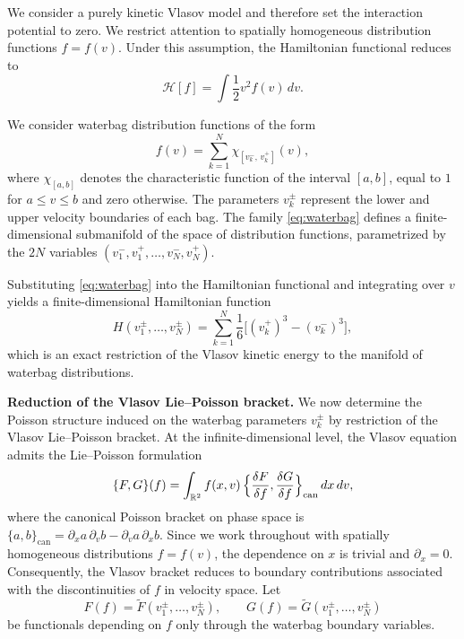 \documentclass{article}
\theoremstyle{remark}
\theoremstyle{definition}
\begin{document}
We consider a purely kinetic Vlasov model and therefore set the interaction
potential to zero. We restrict attention to spatially homogeneous distribution
functions $f=f(v)$. Under this assumption, the Hamiltonian functional reduces to
\begin{equation}\label{hamwaterbag1}
\mathcal{H}[f]
=
\int \frac12 v^2 f(v)\,dv.
\end{equation}

We consider waterbag distribution functions of the form
\begin{equation}\label{eq:waterbag}
f(v)
=
\sum_{k=1}^N
\chi_{[v_k^-,\,v_k^+]}(v),
\end{equation}
where $\chi_{[a,b]}$ denotes the characteristic function of the interval
$[a,b]$, equal to $1$ for $a\le v\le b$ and zero otherwise. The parameters
$v_k^\pm$ represent the lower and upper velocity boundaries of each bag.
The family \eqref{eq:waterbag} defines a finite-dimensional submanifold of the
space of distribution functions, parametrized by the $2N$ variables
$(v_1^-,v_1^+,\dots,v_N^-,v_N^+)$.

Substituting \eqref{eq:waterbag} into the Hamiltonian functional and integrating
over $v$ yields a finite-dimensional Hamiltonian function
\begin{equation}\label{Ham2}
H(v_1^\pm,\dots,v_N^\pm)
=
\sum_{k=1}^N
\frac16\bigl[(v_k^+)^3-(v_k^-)^3\bigr],
\end{equation}
which is an exact restriction of the Vlasov kinetic energy to the manifold of
waterbag distributions.

\medskip
\noindent
\textbf{Reduction of the Vlasov Lie--Poisson bracket.}
We now determine the Poisson structure induced on the waterbag parameters
$v_k^\pm$ by restriction of the Vlasov Lie--Poisson bracket. At the
infinite-dimensional level, the Vlasov equation admits the Lie--Poisson
formulation
\begin{equation}\label{eq:vlasov-bracket}
\{F,G\}(f)
=
\int_{\mathbb R^2}
f(x,v)\,
\Bigl\{
\frac{\delta F}{\delta f},
\frac{\delta G}{\delta f}
\Bigr\}_{\mathrm{can}}
\,dx\,dv,
\end{equation}
where the canonical Poisson bracket on phase space is $\{a,b\}_{\mathrm{can}}
=
\partial_x a\,\partial_v b - \partial_v a\,\partial_x b$. Since we work throughout with spatially homogeneous distributions $f=f(v)$,
the dependence on $x$ is trivial and $\partial_x=0$. Consequently, the Vlasov
bracket reduces to boundary contributions associated with the discontinuities
of $f$ in velocity space. Let
\[
F(f)=\tilde F(v_1^\pm,\dots,v_N^\pm),
\qquad
G(f)=\tilde G(v_1^\pm,\dots,v_N^\pm)
\]
be functionals depending on $f$ only through the waterbag boundary variables.
\end{document}
